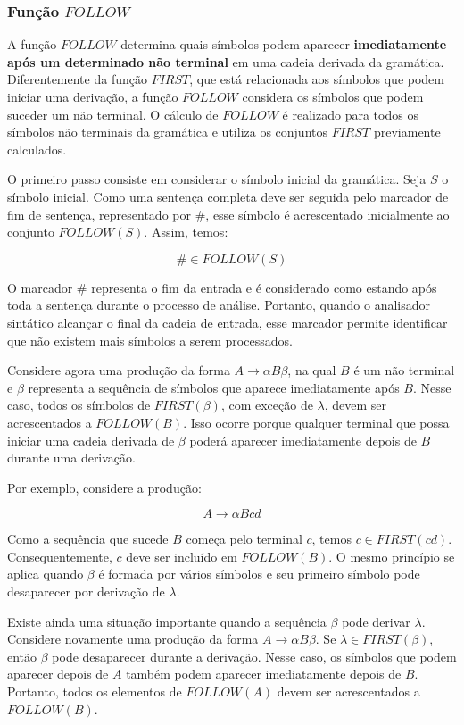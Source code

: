 \documentclass[
  brazilian,
  letterpaper,
]{book}
\theoremstyle{plain}
\theoremstyle{definition}
\theoremstyle{remark}
\begin{document}
\subsubsection{\texorpdfstring{Função
\(FOLLOW\)}{Função FOLLOW}}\label{funuxe7uxe3o-follow}

A função \(FOLLOW\) determina quais símbolos podem aparecer
\textbf{imediatamente após um determinado não terminal} em uma cadeia
derivada da gramática. Diferentemente da função \(FIRST\), que está
relacionada aos símbolos que podem iniciar uma derivação, a função
\(FOLLOW\) considera os símbolos que podem suceder um não terminal. O
cálculo de \(FOLLOW\) é realizado para todos os símbolos não terminais
da gramática e utiliza os conjuntos \(FIRST\) previamente calculados.

O primeiro passo consiste em considerar o símbolo inicial da gramática.
Seja \(S\) o símbolo inicial. Como uma sentença completa deve ser
seguida pelo marcador de fim de sentença, representado por \(\#\), esse
símbolo é acrescentado inicialmente ao conjunto \(FOLLOW(S)\). Assim,
temos:

\[
\# \in FOLLOW(S)
\]

O marcador \(\#\) representa o fim da entrada e é considerado como
estando após toda a sentença durante o processo de análise. Portanto,
quando o analisador sintático alcançar o final da cadeia de entrada,
esse marcador permite identificar que não existem mais símbolos a serem
processados.

Considere agora uma produção da forma \(A\rightarrow\alpha B\beta\), na
qual \(B\) é um não terminal e \(\beta\) representa a sequência de
símbolos que aparece imediatamente após \(B\). Nesse caso, todos os
símbolos de \(FIRST(\beta)\), com exceção de \(\lambda\), devem ser
acrescentados a \(FOLLOW(B)\). Isso ocorre porque qualquer terminal que
possa iniciar uma cadeia derivada de \(\beta\) poderá aparecer
imediatamente depois de \(B\) durante uma derivação.

Por exemplo, considere a produção:

\[
A\rightarrow \alpha Bcd
\]

Como a sequência que sucede \(B\) começa pelo terminal \(c\), temos
\(c\in FIRST(cd)\). Consequentemente, \(c\) deve ser incluído em
\(FOLLOW(B)\). O mesmo princípio se aplica quando \(\beta\) é formada
por vários símbolos e seu primeiro símbolo pode desaparecer por
derivação de \(\lambda\).

Existe ainda uma situação importante quando a sequência \(\beta\) pode
derivar \(\lambda\). Considere novamente uma produção da forma
\(A\rightarrow\alpha B\beta\). Se \(\lambda\in FIRST(\beta)\), então
\(\beta\) pode desaparecer durante a derivação. Nesse caso, os símbolos
que podem aparecer depois de \(A\) também podem aparecer imediatamente
depois de \(B\). Portanto, todos os elementos de \(FOLLOW(A)\) devem ser
acrescentados a \(FOLLOW(B)\).
\end{document}
